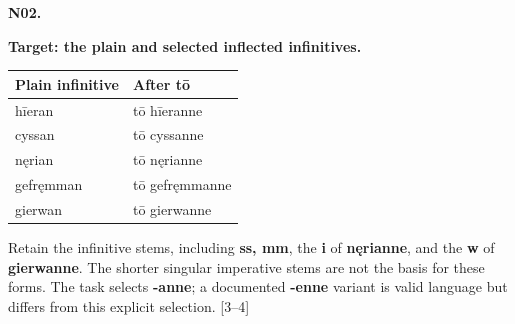 \par\begin{minipage}{\linewidth}\raggedright
\textbf{N02.}

\textbf{Target: the plain and selected inflected infinitives.}

\par\begingroup
\fontsize{10.5}{13.2}\selectfont
\setlength{\LTleft}{0pt}\setlength{\LTright}{\fill}
\noindent
\begin{tabular}{@{}>{\raggedright\arraybackslash}p{61.44mm}>{\raggedright\arraybackslash}p{59.75mm}@{}}
\toprule
\textbf{Plain infinitive} & \textbf{After tō} \\
\midrule
hīeran & tō hīeranne \\
cyssan & tō cyssanne \\
nęrian & tō nęrianne \\
gefręmman & tō gefręmmanne \\
gierwan & tō gierwanne \\
\bottomrule
\end{tabular}
\par\endgroup

Retain the infinitive stems, including \textbf{ss, mm}, the \textbf{i} of \textbf{nęrianne}, and the \textbf{w} of \textbf{gierwanne}. The shorter singular imperative stems are not the basis for these forms. The task selects \textbf{-anne}; a documented \textbf{-enne} variant is valid language but differs from this explicit selection. [3–4]

\end{minipage}\par\addvspace{4pt}

